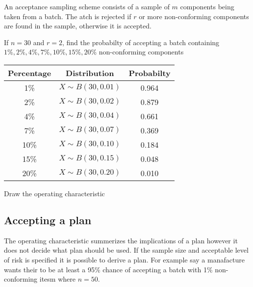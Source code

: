     \begin{example}
    {
        An acceptance sampling scheme consists of a sample of $m$ components being taken from a batch. The atch is rejected if $r$ or more non-conforming components are found in the sample, otherwise it is accepted. 
    }

    \begin{step}{If $n = 30$ and $r = 2$, find the probabilty of accepting a batch containing $1\%, 2\%, 4\%, 7\%, 10\%, 15\%, 20\%$ non-conforming components}
    \begin{center}
    \begin{tabular}{c|c|c}
    Percentage & Distribution & Probabilty \\
    \hline
    1\%  & $X \sim B(30, 0.01)$ & 0.964 \\
    2\%  & $X \sim B(30, 0.02)$ & 0.879 \\
    4\%  & $X \sim B(30, 0.04)$ & 0.661 \\
    7\%  & $X \sim B(30, 0.07)$ & 0.369 \\
    10\% & $X \sim B(30, 0.10)$ & 0.184 \\
    15\% & $X \sim B(30, 0.15)$ & 0.048 \\
    20\% & $X \sim B(30, 0.20)$ & 0.010
    \end{tabular}
    \end{center}
    \end{step}

    \begin{step}{Draw the operating characteristic}
    
    \begin{center}
    \end{center}

    \end{step}
    \end{example}

    \subsection{Accepting a plan}
    The operating characteristic summerizes the implications of a plan however it does not decide what plan should be used. If the sample size and acceptable level of risk is specified it is possible to derive a plan. For example say a manafacture wants their to be at least a 95\% chance of accepting a batch with 1\% non-conforming itesm where $n = 50$.

